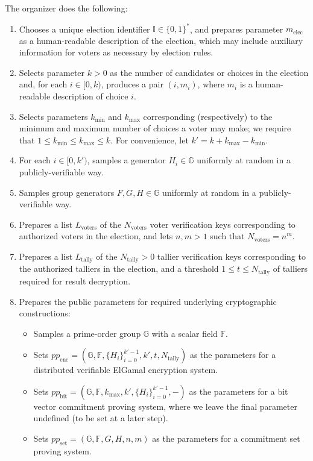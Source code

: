 \documentclass{article}
\newcommand{\G}{\mathbb{G}}
\newcommand{\F}{\mathbb{F}}
\begin{document}
The organizer does the following:
\begin{enumerate}
\item Chooses a unique election identifier $\mathbb{I} \in \{0,1\}^*$, and prepares parameter $m_{\text{elec}}$ as a human-readable description of the election, which may include auxiliary information for voters as necessary by election rules.
\item Selects parameter $k > 0$ as the number of candidates or choices in the election and, for each $i \in [0,k)$, produces a pair $(i,m_i)$, where $m_i$ is a human-readable description of choice $i$.
\item Selects parameters $k_{\text{min}}$ and $k_{\text{max}}$ corresponding (respectively) to the minimum and maximum number of choices a voter may make; we require that $1 \leq k_{\text{min}} \leq k_{\text{max}} \leq k$.
For convenience, let $k' = k + k_{\text{max}} - k_{\text{min}}$.
\item For each $i \in [0,k')$, samples a generator $H_i \in \G$ uniformly at random in a publicly-verifiable way.
\item Samples group generators $F, G, H \in \G$ uniformly at random in a publicly-verifiable way.
\item Prepares a list $L_{\text{voters}}$ of the $N_{\text{voters}}$ voter verification keys corresponding to authorized voters in the election, and lets $n,m > 1$ such that $N_{\text{voters}} = n^m$.
\item Prepares a list $L_{\text{tally}}$ of the $N_{\text{tally}} > 0$ tallier verification keys corresponding to the authorized talliers in the election, and a threshold $1 \leq t \leq N_{\text{tally}}$ of talliers required for result decryption.
\item Prepares the public parameters for required underlying cryptographic constructions:
\begin{itemize}
\item Samples a prime-order group $\G$ with a scalar field $\F$.
\item Sets $pp_{\text{enc}} = (\G, \F, \{H_i\}_{i=0}^{k'-1}, k', t, N_{\text{tally}})$ as the parameters for a distributed verifiable ElGamal encryption system.
\item Sets $pp_{\text{bit}} = (\G, \F, k_{\text{max}}, k', \{H_i\}_{i=0}^{k'-1}, -)$ as the parameters for a bit vector commitment proving system, where we leave the final parameter undefined (to be set at a later step).
\item Sets $pp_{\text{set}} = (\G, \F, G, H, n, m)$ as the parameters for a commitment set proving system.

\end{itemize}
\end{enumerate}
\end{document}
